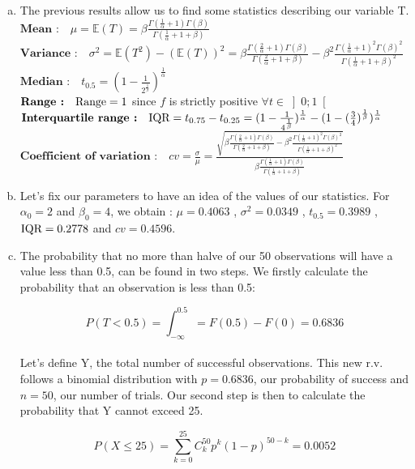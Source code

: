 \documentclass[a4paper]{article}
\begin{document}
\begin{enumerate}[(a)]
\item The previous results allow us to find some statistics describing our variable T.
\\
$\textbf{Mean :} \quad \mu = \mathbb{E}(T) = \beta \frac{\Gamma(\frac{1}{\alpha}+1)\Gamma(\beta)}{\Gamma(\frac{1}{\alpha}+1+\beta)} $
\\
$\textbf{Variance :} \quad \sigma^2 = \mathbb{E}(T^2)-(\mathbb{E}(T))^2 = \beta\frac{\Gamma(\frac{2}{\alpha}+1)\Gamma(\beta)}{\Gamma(\frac{2}{\alpha}+1+\beta)} - \beta^2 \frac{\Gamma(\frac{1}{\alpha}+1)^2\Gamma(\beta)^2}{\Gamma(\frac{1}{\alpha}+1+\beta)^2}$
\\
$\textbf{Median :} \quad t_{0.5} = (1-\frac{1}{2^{\frac{1}{\beta}}})^\frac{1}{\alpha}$
\\
$\textbf{Range :} \quad \textup{Range} = 1$ since $f$ is strictly positive $\forall t \in \left ]  0;1 \right [ $
\\
$\textbf{Interquartile range :} \quad \textup{IQR} = t_{0.75} - t_{0.25} = (1-\frac{1}{4^\frac{1}{\beta}})^\frac{1}{\alpha} - (1-(\frac{3}{4})^\frac{1}{\beta})^\frac{1}{\alpha}$
\\
$\textbf{Coefficient of variation :} \quad cv = \frac{\sigma}{\mu} = \frac{\sqrt{\beta\frac{\Gamma(\frac{2}{\alpha}+1)\Gamma(\beta)}{\Gamma(\frac{2}{\alpha}+1+\beta)} - \beta^2 \frac{\Gamma(\frac{1}{\alpha}+1)^2\Gamma(\beta)^2}{\Gamma(\frac{1}{\alpha}+1+\beta)^2}}}{\beta \frac{\Gamma(\frac{1}{\alpha}+1)\Gamma(\beta)}{\Gamma(\frac{1}{\alpha}+1+\beta)}}$

\item Let's fix our parameters to have an idea of the values of our statistics. For $\alpha_0 = 2$ and $\beta_0 = 4$, we obtain : $\mu = 0.4063$ , $\sigma^2 = 0.0349$ , $t_{0.5} = 0.3989$ , $\textup{IQR} = 0.2778$ and $cv = 0.4596$.

\item The probability that no more than halve of our 50 observations will have a value less than 0.5, can be found in two steps. We firstly calculate the probability that an observation is less than 0.5:

$$P(T<0.5) = \int_{-\infty}^{0.5} = F(0.5) - F(0) = 0.6836 $$
\\
Let's define Y, the total number of successful observations. This new r.v. follows a binomial distribution with $p=0.6836$, our probability of success and $n=50$, our number of trials. Our second step is then to calculate the probability that Y cannot exceed 25.

$$P(X \leq 25) = \sum_{k=0}^{25} C_{k}^{50}p^{k}(1-p)^{50-k} = 0.0052$$


\end{enumerate}
\end{document}
